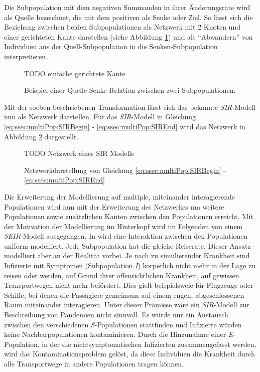 Die Subpopulation mit dem negativen Summanden in ihrer Änderungsrate wird als Quelle bezeichnet, die mit dem positiven als Senke oder Ziel. So lässt sich die Beziehung zwischen beiden Subpopulationen als Netzwerk mit 2 Knoten und einer gerichteten Kante darstellen (siehe Abbildung \ref{fig:ssec:multiPop:simpleDirectedEdge}) und als ``Abwandern'' von Individuen aus der Quell-Subpopulation in die Senken-Subpopulation interpretieren.

\begin{figure}
TODO einfache gerichtete Kante
\caption{Beispiel einer Quelle-Senke Relation zwischen zwei Subpopulationen.}\label{fig:ssec:multiPop:simpleDirectedEdge}
\end{figure}

Mit der soeben beschriebenen Transformation lässt sich das bekannte \emph{SIR}-Modell nun als Netzwerk darstellen. Für das \emph{SIR}-Modell in Gleichung \ref{eq:ssec:multiPop:SIRBegin} - \ref{eq:ssec:multiPop:SIREnd} wird das Netzwerk in Abbildung \ref{fig:ssec:multiPop:SIRNet} dargestellt.

\begin{figure}
TODO Netzwerk eines SIR Modells
\caption{Netzwerkdarstellung von Gleichung \ref{eq:ssec:multiPop:SIRBegin} - \ref{eq:ssec:multiPop:SIREnd}}\label{fig:ssec:multiPop:SIRNet}
\end{figure}

Die Erweiterung der Modellierung auf multiple, miteinander interagierende Populationen wird nun mit der Erweiterung des Netzwerkes um weitere Populationen sowie zusätzlichen Kanten zwischen den Populationen erreicht. Mit der Motivation der Modellierung im Hinterkopf wird im Folgenden von einem \emph{SEIR}-Modell ausgegangen. In \cite{Sattenspiel1995} wird eine Interaktion zwischen den Populationen uniform modelliert. Jede Subpopulation hat die gleiche Reiserate. Dieser Ansatz modelliert aber an der Realität vorbei. Je nach zu simulierender Krankheit sind Infizierte mit Symptomen (Subpopulation \emph{I}) körperlich nicht mehr in der Lage zu reisen oder werden, auf Grund ihrer offensichtlichen Krankheit, auf gewissen Transportwegen nicht mehr befördert. Dies gielt beispielsweie für Flugzeuge oder Schiffe, bei denen die Passagiere gemeinsam auf einem engen, abgeschlossenen Raum miteinander interagieren. Unter dieser Prämisse wäre ein \emph{SIR}-Modell zur Beschreibung von Pandemien nicht sinnvoll. Es würde nur ein Austausch zwischen den verschiedenen \emph{S}-Populationen stattfinden und Infizierte würden keine Nachbarpopulationen kontaminieren.  Durch die Hinzunahme einer \emph{E}-Population, in der die nichtsymptomatischen Infizierten zusammengefasst werden, wird das Kontaminationsproblem gelöst, da diese Individuen die Krankheit durch alle Transportwege in andere Populationen tragen können. 

